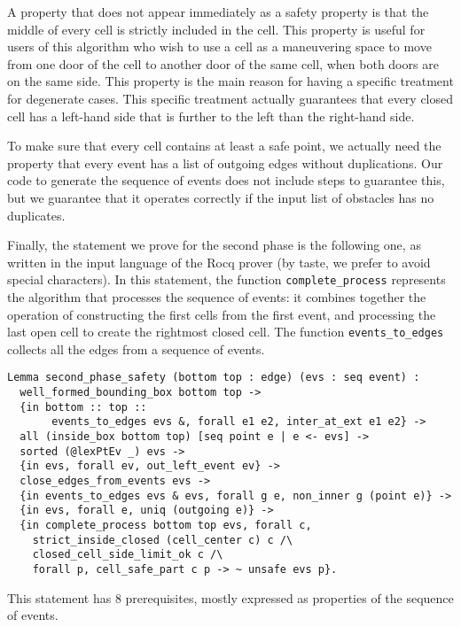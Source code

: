 \documentclass[a4paper, USenglish, cleveref, autoref, thm-restate, final]{lipics-v2021}
\begin{document}
A property that does not appear immediately as a safety property is
that the middle of every cell is strictly included in the cell.  This
property is useful for users of this algorithm who wish to use a cell
as a maneuvering space to move from one door of the cell to another door of
the same cell, when both doors are on the same side.  This property is
the main reason for having a specific treatment for degenerate cases.
This specific treatment actually guarantees that every closed cell has
a left-hand side that is further to the left than the
right-hand side.

To make sure that every cell contains at least a safe point, we
actually need the property that every event has a list of outgoing
edges without duplications.  Our code to generate the sequence of
events does not include steps to guarantee this, but we guarantee
that it operates correctly if the input
list of obstacles has no duplicates.

Finally, the statement we prove for the second phase is the following one,
as written in the input language of the Rocq prover (by taste, we prefer
to avoid special characters).  In this statement, the function
{\tt complete\_process} represents the algorithm that processes the sequence of
events: it combines together the operation of constructing the first cells
from the first event, and processing the last open cell to create the rightmost
closed cell.  The function {\tt events\_to\_edges} collects all the edges
from a sequence of events.
\begin{verbatim}
Lemma second_phase_safety (bottom top : edge) (evs : seq event) :
  well_formed_bounding_box bottom top ->
  {in bottom :: top ::
       events_to_edges evs &, forall e1 e2, inter_at_ext e1 e2} ->
  all (inside_box bottom top) [seq point e | e <- evs] ->
  sorted (@lexPtEv _) evs ->
  {in evs, forall ev, out_left_event ev} ->
  close_edges_from_events evs ->
  {in events_to_edges evs & evs, forall g e, non_inner g (point e)} ->
  {in evs, forall e, uniq (outgoing e)} ->
  {in complete_process bottom top evs, forall c,
    strict_inside_closed (cell_center c) c /\
    closed_cell_side_limit_ok c /\
    forall p, cell_safe_part c p -> ~ unsafe evs p}.
\end{verbatim}
This statement has 8 prerequisites, mostly expressed as properties of the
sequence of events.
\end{document}
